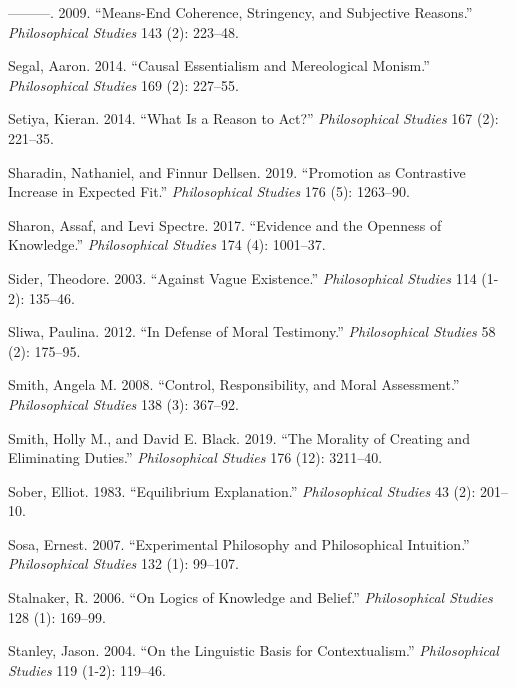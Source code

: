 \documentclass[
  10pt,
  letterpaper,
  DIV=11,
  numbers=noendperiod,
  twoside]{scrartcl}
\newlength{\cslhangindent}
\newenvironment{CSLReferences}[2] %
 {\begin{list}{}{%
  \setlength{\itemindent}{0pt}
  \setlength{\leftmargin}{0pt}
  \setlength{\parsep}{0pt}
  \ifodd #1
   \setlength{\leftmargin}{\cslhangindent}
   \setlength{\itemindent}{-1\cslhangindent}
  \fi
  \setlength{\itemsep}{#2\baselineskip}}}
 {\end{list}}
\begin{document}
\begin{CSLReferences}{1}{0}
---------. 2009. {``Means-End Coherence, Stringency, and Subjective
Reasons.''} \emph{Philosophical Studies} 143 (2): 223--48.

Segal, Aaron. 2014. {``Causal Essentialism and Mereological Monism.''}
\emph{Philosophical Studies} 169 (2): 227--55.

Setiya, Kieran. 2014. {``What Is a Reason to Act?''} \emph{Philosophical
Studies} 167 (2): 221--35.

Sharadin, Nathaniel, and Finnur Dellsen. 2019. {``Promotion as
Contrastive Increase in Expected Fit.''} \emph{Philosophical Studies}
176 (5): 1263--90.

Sharon, Assaf, and Levi Spectre. 2017. {``Evidence and the Openness of
Knowledge.''} \emph{Philosophical Studies} 174 (4): 1001--37.

Sider, Theodore. 2003. {``Against Vague Existence.''}
\emph{Philosophical Studies} 114 (1-2): 135--46.

Sliwa, Paulina. 2012. {``In Defense of Moral Testimony.''}
\emph{Philosophical Studies} 58 (2): 175--95.

Smith, Angela M. 2008. {``Control, Responsibility, and Moral
Assessment.''} \emph{Philosophical Studies} 138 (3): 367--92.

Smith, Holly M., and David E. Black. 2019. {``The Morality of Creating
and Eliminating Duties.''} \emph{Philosophical Studies} 176 (12):
3211--40.

Sober, Elliot. 1983. {``Equilibrium Explanation.''} \emph{Philosophical
Studies} 43 (2): 201--10.

Sosa, Ernest. 2007. {``Experimental Philosophy and Philosophical
Intuition.''} \emph{Philosophical Studies} 132 (1): 99--107.

Stalnaker, R. 2006. {``On Logics of Knowledge and Belief.''}
\emph{Philosophical Studies} 128 (1): 169--99.

Stanley, Jason. 2004. {``On the Linguistic Basis for Contextualism.''}
\emph{Philosophical Studies} 119 (1-2): 119--46.


\end{CSLReferences}
\end{document}
